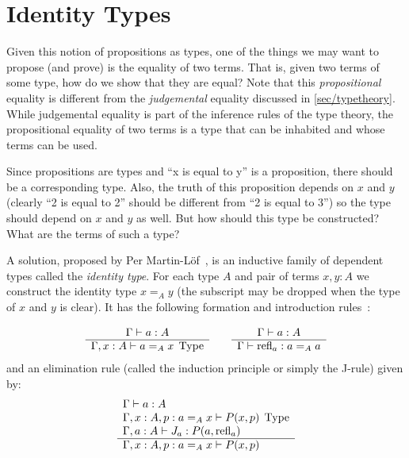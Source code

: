 \section{Identity Types}\label{sec/identitytypes}

Given this notion of propositions as types, one of the things we may want to
propose (and prove) is the equality of two terms. That is, given two terms of
some type, how do we show that they are equal? Note that this
\emph{propositional} equality is different from the \emph{judgemental} equality
discussed in \autoref{sec/typetheory}. While judgemental equality is part of the
inference rules of the type theory, the propositional equality of two terms is a
type that can be inhabited and whose terms can be used. 

Since propositions are types and ``x is equal to y'' is a proposition, there
should be a corresponding type. Also, the truth of this proposition depends on
$x$ and $y$ (clearly ``2 is equal to 2'' should be different from ``2 is equal
to 3'') so the type should depend on $x$ and $y$ as well. But how should this
type be constructed? What are the terms of such a type?

A solution, proposed by Per Martin-Löf~\cite{ML75}, is an inductive family of dependent
types called the \emph{identity type}. For each type $A$ and pair of terms
$x,y:A$ we construct the identity type $x =_A y$ (the subscript may be dropped
when the type of $x$ and $y$ is clear). It has the following formation and introduction
rules~\cite{Rijke2019}:

\[
  \begin{array}[t]{c}
    \Gamma \vdash a:A\\
    \hline
    \Gamma, x:A \vdash a =_A x \; \operatorname{Type}\\
  \end{array}
  \qquad
  \begin{array}[t]{c}
    \Gamma \vdash a:A\\
    \hline
    \Gamma \vdash \operatorname{refl}_a : a =_A a
  \end{array}
\]
and an elimination rule (called the induction principle or simply the J-rule) given by:
\[
  \begin{array}[t]{l}
    \Gamma \vdash a:A\\
    \Gamma, x:A, p:a =_A x \vdash P(x,p) \; \operatorname{Type}\\
    \Gamma, a:A \vdash J_a : P(a,\operatorname{refl}_a)\\
    \hline
    \Gamma, x:A, p:a=_Ax \vdash P(x,p)
  \end{array}
\]


